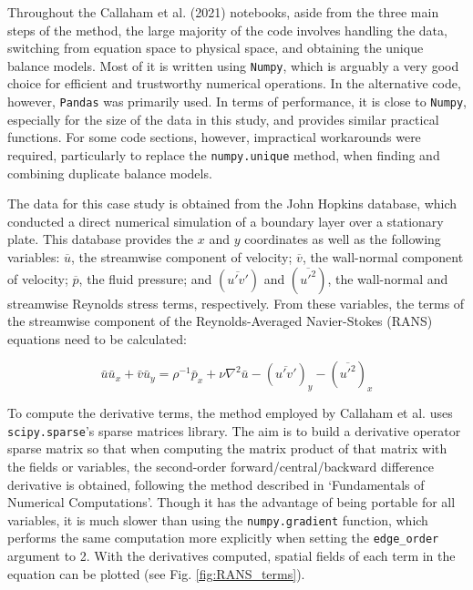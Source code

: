 \documentclass[12pt]{report} %
\begin{document}
Throughout the Callaham et al. (2021)\cite{callaham2021learning} notebooks, aside from the three main steps of the method, the large majority of the code involves handling the data, switching from equation space to physical space, and obtaining the unique balance models. Most of it is written using \texttt{Numpy}, which is arguably a very good choice for efficient and trustworthy numerical operations. In the alternative code, however, \texttt{Pandas} was primarily used. In terms of performance, it is close to \texttt{Numpy}, especially for the size of the data in this study, and provides similar practical functions. For some code sections, however, impractical workarounds were required, particularly to replace the \texttt{numpy.unique} method, when finding and combining duplicate balance models.

The data for this case study is obtained from the John Hopkins database, which conducted a direct numerical simulation of a boundary layer over a stationary plate\cite{jhtdb}. This database provides the $x$ and $y$ coordinates as well as the following variables: $\overline{u}$, the streamwise component of velocity;  $\overline{v}$, the wall-normal component of velocity;  $\overline{p}$, the fluid pressure; and $(\overline{u{\prime} v{\prime}})$ and $(\overline{u{\prime}^2})$, the wall-normal and streamwise Reynolds stress terms, respectively. From these variables, the terms of the streamwise component of the Reynolds-Averaged Navier-Stokes (RANS) equations need to be calculated:

\begin{equation}
  \bar{u} \bar{u}_x + \bar{v} \bar{u}_y = \rho^{-1} \bar{p}_x + \nu \nabla^2 \bar{u}  - (\overline{u' v'})_y - (\overline{u'^2})_x
\end{equation}

To compute the derivative terms, the method employed by Callaham et al. uses \texttt{scipy.sparse}’s sparse matrices library. The aim is to build a derivative operator sparse matrix so that when computing the matrix product of that matrix with the fields or variables, the second-order forward/central/backward difference derivative is obtained, following the method described in ‘Fundamentals of Numerical Computations’\cite{finitediff}. Though it has the advantage of being portable for all variables, it is much slower than using the \texttt{numpy.gradient} function, which performs the same computation more explicitly when setting the \texttt{edge\_order} argument to 2. With the derivatives computed, spatial fields of each term in the equation can be plotted (see Fig. \ref{fig:RANS_terms}).
\end{document}
